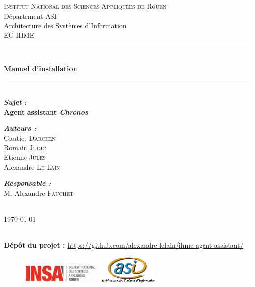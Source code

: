 \begin{titlepage}
\newcommand{\HRule}{\rule{\linewidth}{0.5mm}}
\center
{}\textsc{\huge Institut National des Sciences Appliquées de Rouen}\\[0.7cm]
\LARGE Département ASI~\\[0.5cm]
\Large{Architecture des Systèmes d'Information} ~\\[1.5cm]
\textsc{\Large EC IHME}\\[1cm]

\HRule \\[0.4cm]
{ \huge \bfseries Manuel d'installation}\\[0.2cm] \HRule \\[1.5cm]

\LARGE \emph{\textbf{Sujet :}} \\
\textbf{Agent assistant \emph{Chronos}}\\[2cm]

\large
\begin{minipage}[c]{.3\linewidth}
	\begin{flushleft}
       \emph{\textbf{Auteurs :}}\\
       Gautier \textsc{Darchen}\\
       Romain \textsc{Judic}\\
       Etienne \textsc{Jules}\\
        Alexandre \textsc{Le Lain}

	\end{flushleft}
   \end{minipage} \hfill
   \begin{minipage}[c]{.3\linewidth}
  	 \begin{flushright}
 	\emph{\textbf{Responsable :}}\\
		M. Alexandre \textsc{Pauchet}
	\end{flushright}
   \end{minipage}

~\\[1.5cm]

\vfill{\today}

~\\[1.5cm]
\textbf{Dépôt du projet : } \url{https://github.com/alexandre-lelain/ihme-agent-assistant/}

\begin{figure}
\includegraphics[width=4cm]{images/LogoINSA.png}\hfill
\includegraphics[width=3cm]{images/logoasi.png}
\end{figure}


 \end{titlepage}
